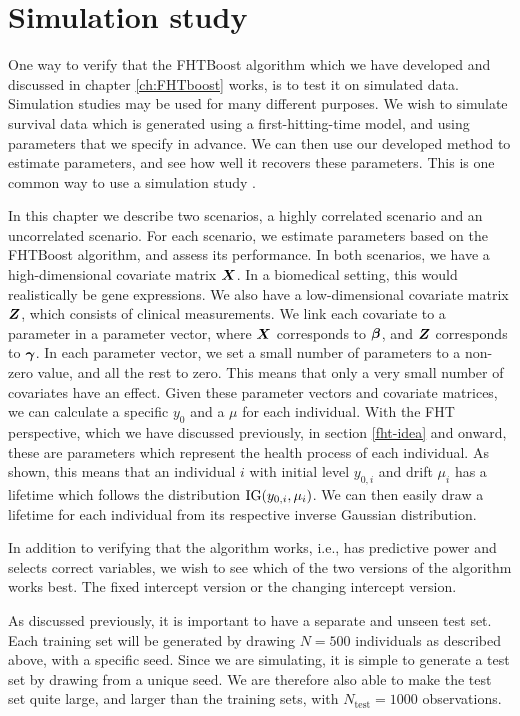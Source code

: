 \chapter{Simulation study}
One way to verify that the FHTBoost algorithm which we have developed and discussed in chapter \ref{ch:FHTboost} works, is to test it on simulated data.
Simulation studies may be used for many different purposes.
We wish to simulate survival data which is generated using a first-hitting-time model, and using parameters that we specify in advance.
We can then use our developed method to estimate parameters, and see how well it recovers these parameters.
This is one common way to use a simulation study \citep{simulation-studies}.

In this chapter we describe two scenarios, a highly correlated scenario and an uncorrelated scenario. 
For each scenario, we estimate parameters based on the FHTBoost algorithm, and assess its performance.
In both scenarios, we have a high-dimensional covariate matrix $\bm{X}$.
In a biomedical setting, this would realistically be gene expressions.
We also have a low-dimensional covariate matrix $\bm{Z}$, which consists of clinical measurements.
We link each covariate to a parameter in a parameter vector, where $\bm{X}$ corresponds to $\boldsymbol{\beta}$, and $\bm{Z}$ corresponds to $\boldsymbol{\gamma}$.
In each parameter vector, we set a small number of parameters to a non-zero value, and all the rest to zero.
This means that only a very small number of covariates have an effect.
Given these parameter vectors and covariate matrices, we can calculate a specific $y_0$ and a $\mu$ for each individual.
With the FHT perspective, which we have discussed previously, in section \ref{fht-idea} and onward, these are parameters which represent the health process of each individual.
As shown, this means that an individual $i$ with initial level $y_{0,i}$ and drift $\mu_i$ has a lifetime which follows the distribution $\operatorname{IG}(y_{0,i},\mu_i)$.
We can then easily draw a lifetime for each individual from its respective inverse Gaussian distribution.

In addition to verifying that the algorithm works, i.e., has predictive power and selects correct variables, we wish to see which of the two versions of the algorithm works best.
The fixed intercept version or the changing intercept version.

As discussed previously, it is important to have a separate and unseen test set.
Each training set will be generated by drawing $N=500$ individuals as described above, with a specific seed.
Since we are simulating, it is simple to generate a test set by drawing from a unique seed.
We are therefore also able to make the test set quite large, and larger than the training sets, with $N_{\text{test}}=1000$ observations.

